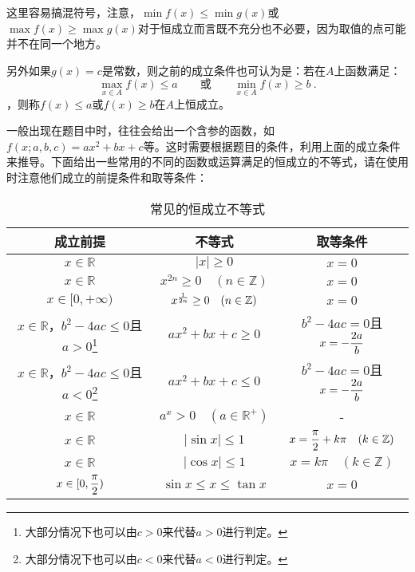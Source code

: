 这里容易搞混符号，注意，$\min f(x)\leq\min g(x)$或$\max f(x)\geq\max g(x)$对于恒成立而言既不充分也不必要，因为取值的点可能并不在同一个地方。

另外如果$g(x)=c$是常数，则之前的成立条件也可认为是：若在$A$上函数满足：
\begin{equation}
\displaystyle\max_{x\in A} f(x)\leq a\qquad\text{或}\qquad\min_{x\in A} f(x)\geq b~.
\end{equation}
，则称$f(x)\leq a$或$f(x)\geq b$在$A$上恒成立。

一般出现在题目中时，往往会给出一个含参的函数，如$f(x;a,b,c)=ax^2+bx+c$等。这时需要根据题目的条件，利用上面的成立条件来推导。下面给出一些常用的不同的函数或运算满足的恒成立的不等式，请在使用时注意他们成立的前提条件和取等条件：
\begin{table}[ht]
\centering
\caption{常见的恒成立不等式}\label{tab_HsIden1}
\begin{tabular}{|c|c|c|}
\hline
成立前提 & 不等式 & 取等条件 \\
\hline
$x\in\mathbb{R}$&$|x|\geq0$&$x=0$ \\
\hline
$x\in\mathbb{R}$&$x^{2n}\geq0\quad(n\in\mathbb{Z})$&$x=0$\\
\hline
$x\in[0,+\infty)$&$x^{1\over2n}\geq0\quad(n\in\mathbb{Z})$&$x=0$\\
\hline
$x\in\mathbb{R}$，$b^2-4ac\leq0$且$a>0$\footnote{大部分情况下也可以由$c>0$来代替$a>0$进行判定。}&$ax^2+bx+c\geq0$&$b^2-4ac=0$且$\displaystyle x=-{2a\over b}$\\
\hline
$x\in\mathbb{R}$，$b^2-4ac\leq0$且$a<0$\footnote{大部分情况下也可以由$c<0$来代替$a<0$进行判定。}&$ax^2+bx+c\leq0$&$b^2-4ac=0$且$\displaystyle x=-{2a\over b}$\\
\hline
$x\in\mathbb{R}$&$a^x>0\quad(a\in\mathbb{R}^+)$&-\\
\hline
$x\in\mathbb{R}$&$|\sin x|\leq 1$&$\displaystyle x={\pi\over2}+k\pi\quad (k\in\mathbb{Z})$\\
\hline
$x\in\mathbb{R}$&$|\cos x|\leq 1$&$x=k\pi\quad (k\in\mathbb{Z})$\\
\hline
$\displaystyle x\in[0,{\pi\over2})$&$\sin x\leq x\leq\tan x$&$x=0$\\
\hline
\end{tabular}
\end{table}


